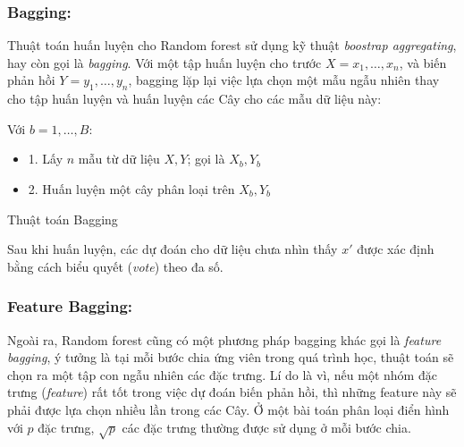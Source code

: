 \subsubsection{Bagging:} Thuật toán huấn luyện cho Random forest sử dụng kỹ thuật \emph{boostrap aggregating}, hay còn gọi là \emph{bagging}. Với một tập huấn luyện cho trước $X = x_1,\dots,x_n$, và biến phản hồi $Y=y_1,\dots,y_n$, bagging lặp lại việc lựa chọn một mẫu ngẫu nhiên thay cho tập huấn luyện và huấn luyện các Cây cho các mẫu dữ liệu này:
      \begin{algorithm}[h!]
          \DontPrintSemicolon
          Với $b = 1,\dots,B:$
          \begin{itemize}
              \item 1. Lấy $n$ mẫu từ dữ liệu $X, Y$; gọi là $X_b, Y_b$
              \item 2. Huấn luyện một cây phân loại trên $X_b, Y_b$
          \end{itemize}
          \caption{Thuật toán Bagging}
          \label{alg:Bagging}
      \end{algorithm}
      Sau khi huấn luyện, các dự đoán cho dữ liệu chưa nhìn thấy $x'$ được xác định bằng cách biểu quyết (\emph{vote}) theo đa số.
\subsubsection{Feature Bagging:} 
      Ngoài ra, Random forest cũng có một phương pháp bagging khác gọi là \emph{feature bagging}, ý tưởng là tại mỗi bước chia ứng viên trong quá trình học, thuật toán sẽ chọn ra một tập con ngẫu nhiên các đặc trưng. Lí do là vì, nếu một nhóm đặc trưng (\emph{feature}) rất tốt trong việc dự đoán biến phản hồi, thì những feature này sẽ phải được lựa chọn nhiều lần trong các Cây. Ở một bài toán phân loại điển hình với $p$ đặc trưng, $\sqrt{p}$ các đặc trưng thường được sử dụng ở mỗi bước chia. 

